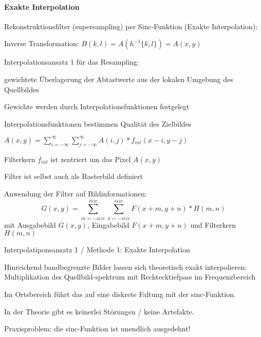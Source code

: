 \documentclass[landscape]{article}
\begin{document}
\begin{multicols}{3}
  \paragraph{Exakte Interpolation}
  Rekonstruktionsfilter (supersampling) per Sinc-Funktion (Exakte Interpolation):
  \begin{itemize*}
    \item Inverse Transformation: $B(k, l) = A(h^{-1} \{k, l\}) = A(x, y )$
    \item Interpolationsansatz 1 für das Resampling:
    \begin{itemize*}
      \item gewichtete Überlagerung der Abtastwerte aus der lokalen Umgebung des Quellbildes
      \item Gewichte werden durch Interpolationsfunktionen festgelegt
      \item Interpolationsfunktionen bestimmen Qualität des Zielbildes
      \item $A(x,y)=\sum_{i=-\infty}^{\infty}\sum_{j=-\infty}^{\infty}A(i,j) * f_{int}(x-i, y-j)$
      \item Filterkern $f_{int}$ ist zentriert um das Pixel $A(x, y)$
      \item Filter ist selbst auch als Rasterbild definiert
    \end{itemize*}
  \end{itemize*}
  
  Anwendung der Filter auf Bildinformationen: 
  $$G(x,y)=\sum_{m=-size}^{size} \sum_{n=-size}^{size} F(x+m, y+n) * H(m,n)$$
  mit Ausgabebild $G(x,y)$, Eingabebild $F(x+m,y+n)$ und Filterkern $H(m,n)$
  
  Interpolatiponsansatz 1 / Methode 1: Exakte Interpolation
  \begin{itemize*}
    \item Hinreichend bandbegrenzte Bilder lassen sich theoretisch exakt interpolieren: Multiplikation des Quellbild-spektrum mit Rechtecktiefpass im Frequenzbereich
    \item Im Ortsbereich führt das auf eine diskrete Faltung mit der sinc-Funktion.
    \item In der Theorie gibt es keinerlei Störungen / keine Artefakte.
    \item Praxisproblem: die sinc-Funktion ist unendlich ausgedehnt!
  \end{itemize*}
  

\end{multicols}
\end{document}
